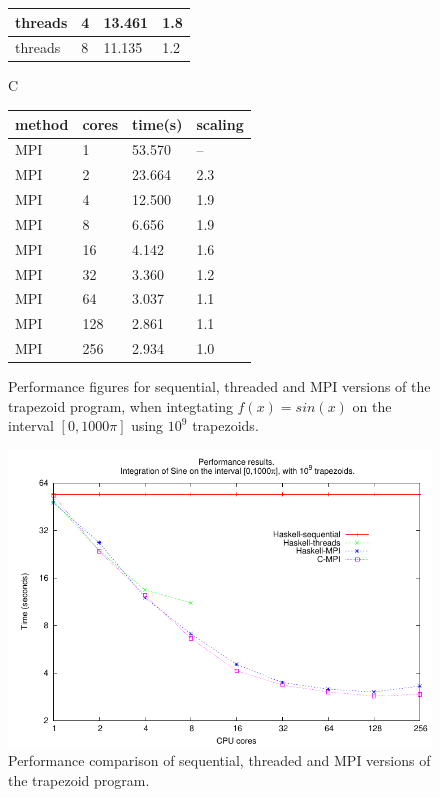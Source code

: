 \documentclass{tmr}
\begin{document}
\begin{figure}
\begin{minipage}[t]{0.5\linewidth}
\begin{tabular}{|l|l|l|l|}
threads & 4    & 13.461  & 1.8 \\ \hline
threads & 8    & 11.135  & 1.2 \\ \hline
\end{tabular}
\end{minipage}
\begin{minipage}[t]{0.5\linewidth}
\centering
C \\[3mm]
\begin{tabular}{|l|l|l|l|} \hline
method & cores & time(s) & scaling \\ \hline\hline
MPI & 1      & 53.570  & -- \\ \hline
MPI & 2      & 23.664  & 2.3 \\ \hline
MPI & 4      & 12.500  & 1.9 \\ \hline
MPI & 8      &  6.656  & 1.9 \\ \hline
MPI & 16     &  4.142  & 1.6 \\ \hline
MPI & 32     &  3.360  & 1.2 \\ \hline
MPI & 64     &  3.037  & 1.1 \\ \hline
MPI & 128    &  2.861  & 1.1 \\ \hline
MPI & 256    &  2.934  & 1.0 \\ \hline
\end{tabular}
\end{minipage}
\vspace{3mm}
\caption{Performance figures for sequential, threaded and MPI versions of the trapezoid program,
when integtating $f(x) = sin(x)$ on the interval $[0,1000 \pi]$ using $10^9$ trapezoids. \label{TiminigTable}}
\end{figure}

\begin{figure}
\centering
\includegraphics{performance.pdf}
\vspace{3mm}
\caption{Performance comparison of sequential, threaded and MPI versions of the trapezoid program.
\label{PerformanceGraph}}
\end{figure}
\end{document}
